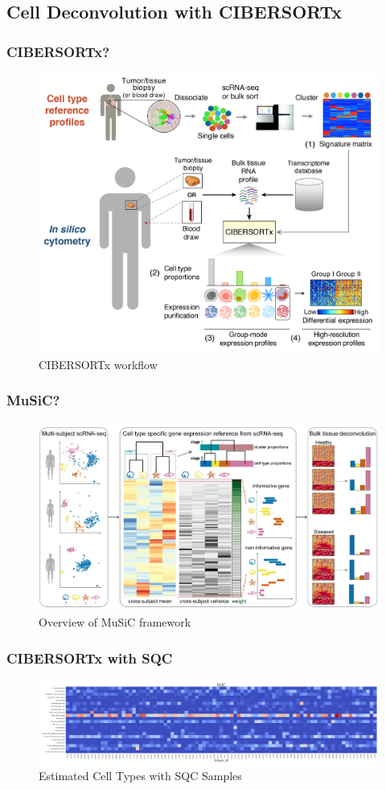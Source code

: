 \documentclass{beamer}
\begin{document}
    \subsection{Cell Deconvolution with CIBERSORTx}
    \begin{frame}
        \frametitle{CIBERSORTx?}

        \begin{figure}
            \includegraphics[width=0.6 \linewidth]{figures/Workflow/CIBERSORTx.png}
            \caption{CIBERSORTx workflow \protect\cite{cibersort1}}
        \end{figure}
    \end{frame}

    \begin{frame}
        \frametitle{MuSiC?}

        \begin{figure}
            \includegraphics[width=0.6 \linewidth]{figures/Workflow/MuSiC.jpg}
            \caption{Overview of MuSiC framework \protect\cite{MuSiC1}}
        \end{figure}
    \end{frame}

    \begin{frame}
        \frametitle{CIBERSORTx with SQC}

        \begin{figure}
            \includegraphics[width=\linewidth]{figures/CIBERSORTx/SQC.Bowtie2.CibersortX.pdf}
            \caption{Estimated Cell Types with SQC Samples}
        \end{figure}
    \end{frame}
\end{document}
